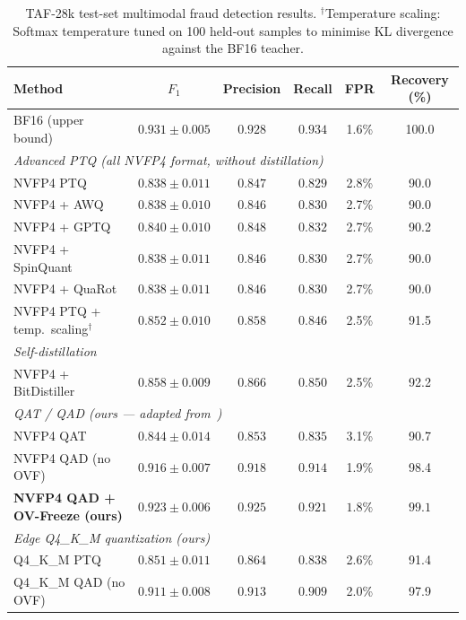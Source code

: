\documentclass[lettersize,journal]{IEEEtran}
\begin{document}
\begin{table}[!t]
\caption{TAF-28k test-set multimodal fraud detection results.
$^\dagger$Temperature scaling: Softmax temperature tuned on 100
held-out samples to minimise KL divergence against the BF16 teacher.}
\label{tab3}
\centering
\renewcommand{\arraystretch}{1.2}
\small
\begin{tabularx}{\textwidth}{Xccccc}
\toprule
\textbf{Method} & \textbf{$F_1$} & \textbf{Precision} & \textbf{Recall}
  & \textbf{FPR} & \textbf{Recovery (\%)} \\
\midrule
BF16 (upper bound) & $0.931\pm0.005$ & $0.928$ & $0.934$ & 1.6\% & 100.0 \\
\midrule
\multicolumn{6}{l}{\emph{Advanced PTQ (all NVFP4 format, without distillation)}} \\
NVFP4 PTQ          & $0.838\pm0.011$ & $0.847$ & $0.829$ & 2.8\% & 90.0 \\
NVFP4 + AWQ~\cite{9}        & $0.838\pm0.010$ & $0.846$ & $0.830$ & 2.7\% & 90.0 \\
NVFP4 + GPTQ~\cite{10}      & $0.840\pm0.010$ & $0.848$ & $0.832$ & 2.7\% & 90.2 \\
NVFP4 + SpinQuant~\cite{11} & $0.838\pm0.011$ & $0.846$ & $0.830$ & 2.7\% & 90.0 \\
NVFP4 + QuaRot~\cite{12}    & $0.838\pm0.011$ & $0.846$ & $0.830$ & 2.7\% & 90.0 \\
NVFP4 PTQ + temp.\ scaling$^\dagger$ & $0.852\pm0.010$ & $0.858$ & $0.846$ & 2.5\% & 91.5 \\
\midrule
\multicolumn{6}{l}{\emph{Self-distillation}} \\
NVFP4 + BitDistiller~\cite{8} & $0.858\pm0.009$ & $0.866$ & $0.850$ & 2.5\% & 92.2 \\
\midrule
\multicolumn{6}{l}{\emph{QAT / QAD (ours --- adapted from~\cite{3})}} \\
NVFP4 QAT          & $0.844\pm0.014$ & $0.853$ & $0.835$ & 3.1\% & 90.7 \\
NVFP4 QAD (no OVF) & $0.916\pm0.007$ & $0.918$ & $0.914$ & 1.9\% & 98.4 \\
\rowcolor[gray]{0.93}\textbf{NVFP4 QAD + OV-Freeze (ours)}
  & $\mathbf{0.923\pm0.006}$ & $\mathbf{0.925}$ & $\mathbf{0.921}$
  & $\mathbf{1.8\%}$ & $\mathbf{99.1}$ \\
\midrule
\multicolumn{6}{l}{\emph{Edge Q4\_K\_M quantization (ours)}} \\
Q4\_K\_M PTQ              & $0.851\pm0.011$ & $0.864$ & $0.838$ & 2.6\% & 91.4 \\
Q4\_K\_M QAD (no OVF)     & $0.911\pm0.008$ & $0.913$ & $0.909$ & 2.0\% & 97.9 \\

\end{tabularx}
\end{table}
\end{document}

